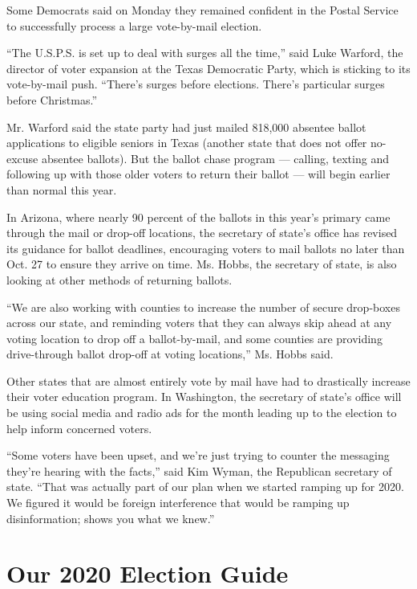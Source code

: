 Some Democrats said on Monday they remained confident in the Postal
Service to successfully process a large vote-by-mail election.

``The U.S.P.S. is set up to deal with surges all the time,'' said Luke
Warford, the director of voter expansion at the Texas Democratic Party,
which is sticking to its vote-by-mail push. ``There's surges before
elections. There's particular surges before Christmas.''

Mr. Warford said the state party had just mailed 818,000 absentee ballot
applications to eligible seniors in Texas (another state that does not
offer no-excuse absentee ballots). But the ballot chase program ---
calling, texting and following up with those older voters to return
their ballot --- will begin earlier than normal this year.

In Arizona, where nearly 90 percent of the ballots in this year's
primary came through the mail or drop-off locations, the secretary of
state's office has revised its guidance for ballot deadlines,
encouraging voters to mail ballots no later than Oct. 27 to ensure they
arrive on time. Ms. Hobbs, the secretary of state, is also looking at
other methods of returning ballots.

``We are also working with counties to increase the number of secure
drop-boxes across our state, and reminding voters that they can always
skip ahead at any voting location to drop off a ballot-by-mail, and some
counties are providing drive-through ballot drop-off at voting
locations,'' Ms. Hobbs said.

Other states that are almost entirely vote by mail have had to
drastically increase their voter education program. In Washington, the
secretary of state's office will be using social media and radio ads for
the month leading up to the election to help inform concerned voters.

``Some voters have been upset, and we're just trying to counter the
messaging they're hearing with the facts,'' said Kim Wyman, the
Republican secretary of state. ``That was actually part of our plan when
we started ramping up for 2020. We figured it would be foreign
interference that would be ramping up disinformation; shows you what we
knew.''

\hypertarget{our-2020-election-guide}{%
\section{Our 2020 Election Guide}\label{our-2020-election-guide}}

